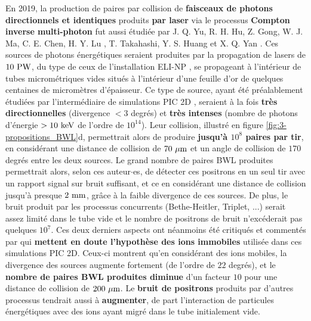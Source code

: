 \begin{refsection}
En 2019, la production de paires par collision de \textbf{faisceaux de photons directionnels et identiques} produits \textbf{par laser} via le processus \textbf{Compton inverse multi-photon} fut aussi étudiée par J. Q. Yu,  R. H. Hu,  Z. Gong,  W. J. Ma, C. E. Chen, H. Y. Lu , T. Takahashi, Y. S. Huang et X. Q. Yan \parencite{yu_2019}.
Ces sources de photons énergétiques seraient produites par la propagation de lasers de $10 ~ \rm PW$, du type de ceux de l'installation ELI-NP \parencite{tanaka_2020}, se propageant à l'intérieur de tubes micrométriques vides situés à l'intérieur d'une feuille d'or de quelques centaines de micromètres d'épaisseur. Ce type de source, ayant été préalablement étudiées par l'intermédiaire de simulations PIC 2D \parencite{yu_2019}, seraient à la fois \textbf{très directionnelles} (divergence $<3$ degrés) et \textbf{très intenses} (nombre de photons d'énergie $>10 ~ \rm keV$ de l'ordre de $10^{14}$). Leur collision, illustré en figure \ref{fig:3-propositions_BWL}d, permettrait alors de produire \textbf{jusqu'à $10^8$ paires par tir}, en considérant une distance de collision de $70 ~ \rm \mu m$ et un angle de collision de $170$ degrés entre les deux sources. Le grand nombre de paires BWL produites permettrait alors, selon ces auteur$\cdot$es, de détecter ces positrons en un seul tir avec un rapport signal sur bruit suffisant, et ce en considérant une distance de collision jusqu'à presque $2 ~ \rm mm$, grâce à la faible divergence de ces sources. De plus, le bruit produit par les processus concurrents (Bethe-Heitler, Triplet, ...) serait assez limité dans le tube vide et le nombre de positrons de bruit n’excéderait pas quelques $10^7$. Ces deux derniers aspects ont néanmoins été critiqués et commentés par \cite{wang_2020a} qui \textbf{mettent en doute l'hypothèse des ions immobiles} utilisée dans ces simulations PIC 2D. Ceux-ci montrent qu'en considérant des ions mobiles, la divergence des sources augmente fortement (de l'ordre de $22$ degrés), et le \textbf{nombre de paires BWL produites diminue} d'un facteur $10$ pour une distance de collision de $200 ~ \rm \mu m$. Le \textbf{bruit de positrons} produits par d'autres processus tendrait aussi à \textbf{augmenter}, de part l'interaction de particules énergétiques avec des ions ayant migré dans le tube initialement vide.



\end{refsection}
